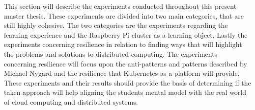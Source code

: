 
This section will describe the experiments conducted throughout this present master thesis. These experiments are divided into two main categories, that are still highly cohesive. The two categories are the experiments regarding the learning experience and the Raspberry Pi cluster as a learning object. Lastly the experiments concerning resilience in relation to finding ways that will highlight the problems and solutions to distributed computing. The experiments concerning resilience will focus upon the anti-patterns and patterns described by Michael Nygard and the resilience that Kubernetes as a platform will provide. These experiments and their results should provide the basis of determining if the taken approach will help aligning the students mental model with the real world of cloud computing and distributed systems.
